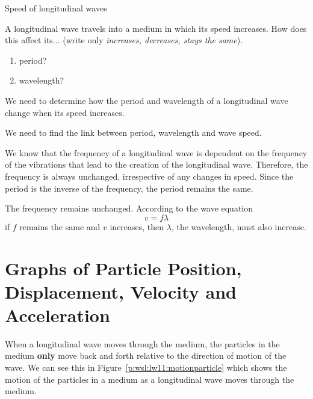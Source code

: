 \begin{wex}
{Speed of longitudinal waves}{A longitudinal wave travels into a medium in which its speed increases.
How does this affect its... (write only \emph{increases, decreases, stays the same}).
\begin{enumerate}
\item period?
\item wavelength?
\end{enumerate}
}{
We need to determine how the period and wavelength of a longitudinal wave change when its speed increases.

We need to find the link between period, wavelength and wave speed.

We know that the frequency of a longitudinal wave is dependent on the frequency of the vibrations that lead to the creation of the longitudinal wave. Therefore, the frequency is always unchanged, irrespective of any changes in speed. Since the period is the inverse of the frequency, the period remains the same.

The frequency remains unchanged. According to the wave equation
\begin{equation*}
v = f\lambda
\end{equation*}
if $f$ remains the same and $v$ increases, then $\lambda$, the wavelength, must also increase.
}
\end{wex}


\section{Graphs of Particle Position, Displacement, Velocity and Acceleration}

When a longitudinal wave moves through the medium, the particles in the medium \textbf{only} move back and forth relative to the direction of motion of the wave. We can see this in Figure~\ref{p:wsl:lw11:motionparticle} which shows the motion of the particles in a medium as a longitudinal wave moves through the medium.

